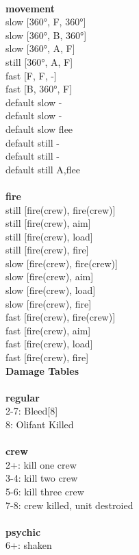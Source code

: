 \ \\ {\bf movement } \\
slow [360°, F, 360°] \\
slow [360°, B, 360°] \\
slow [360°, A, F] \\
still [360°, A, F] \\
fast [F, F, -] \\
fast [B, 360°, F] \\
default slow - \\
default slow - \\
default slow flee \\
default still - \\
default still - \\
default still A,flee \\
\ \\ {\bf fire } \\
still [fire(crew), fire(crew)] \\
still [fire(crew), aim] \\
still [fire(crew), load] \\
still [fire(crew), fire] \\
slow [fire(crew), fire(crew)] \\
slow [fire(crew), aim] \\
slow [fire(crew), load] \\
slow [fire(crew), fire] \\
fast [fire(crew), fire(crew)] \\
fast [fire(crew), aim] \\
fast [fire(crew), load] \\
fast [fire(crew), fire] \\


{\bf Damage Tables} \\
\ \\ {\bf regular } \\
2-7: Bleed[8] \\
8: Olifant Killed \\
\ \\ {\bf crew } \\
2+: kill one crew \\
3-4: kill two crew \\
5-6: kill three crew \\
7-8: crew killed, unit destroied \\
\ \\ {\bf psychic } \\
6+: shaken \\











